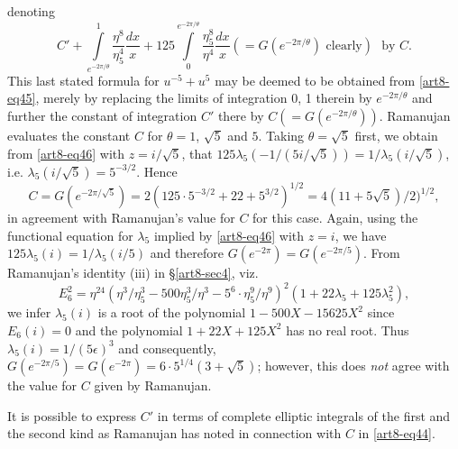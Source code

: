 denoting
$$
C'+\int\limits^{1}_{e^{-2\pi/\theta}}\dfrac{\eta^{8}}{\eta^{4}_{5}}\dfrac{dx}{x}+125\int\limits^{e^{-2\pi/\theta}}_{0}\dfrac{\eta^{8}_{5}}{\eta^{4}}\dfrac{dx}{x}(=G(e^{-2\pi/\theta})\text{~clearly})\text{~ by } C.
$$
This last stated formula for $u^{-5}+u^{5}$ may be deemed to be obtained from \eqref{art8-eq45}, merely by replacing the limits of integration 0, 1 therein by $e^{-2\pi/\theta}$ and further the constant of integration $C'$ there by $C(=G(e^{-2\pi/\theta}))$. Ramanujan evaluates the constant $C$ for $\theta=1$, $\sqrt{5}$ and $5$. Taking $\theta=\sqrt{5}$ first, we obtain from \eqref{art8-eq46} with $z=i/\sqrt{5}$, that $125\lambda_{5}(-1/(5i/\sqrt{5}))=1/\lambda_{5}(i/\sqrt{5})$, i.e. $\lambda_{5}(i/\sqrt{5})=5^{-3/2}$. Hence
$$
C=G(e^{-2\pi/\sqrt{5}})=2(125\cdot 5^{-3/2}+22+5^{3/2})^{1/2}=4(11+5\sqrt{5})/2)^{1/2},
$$
in agreement with Ramanujan's value for $C$ for this case. Again, using the functional equation for $\lambda_{5}$ implied by \eqref{art8-eq46} with $z=i$, we have $125\lambda_{5}(i)=1/\lambda_{5}(i/5)$ and therefore $G(e^{-2\pi})=G(e^{-2\pi/5})$. From Ramanujan's identity (iii) in \S\ref{art8-sec4}, viz.
$$
E^{2}_{6}=\eta^{24}(\eta^{3}/\eta^{3}_{5}-500\eta^{3}_{5}/\eta^{3}-5^{6}\cdot \eta^{9}_{5}/\eta^{9})^{2}(1+22\lambda_{5}+125\lambda^{2}_{5}),
$$
we infer $\lambda_{5}(i)$ is a root of the polynomial $1-500X-15625X^{2}$ since $E_{6}(i)=0$ and the polynomial $1+22X+125X^{2}$ has no real root. Thus $\lambda_{5}(i)=1/(5\epsilon)^{3}$ and consequently, $G(e^{-2\pi/5})=G(e^{-2\pi})=6\cdot 5^{1/4}(3+\sqrt{5})$; however, this does {\em not} agree with the value for $C$ given by Ramanujan.

\begin{remark*}
It is possible to express $C'$ in terms of complete elliptic integrals of the first and the second kind as Ramanujan has noted in connection with $C$ in \eqref{art8-eq44}.
\end{remark*}

